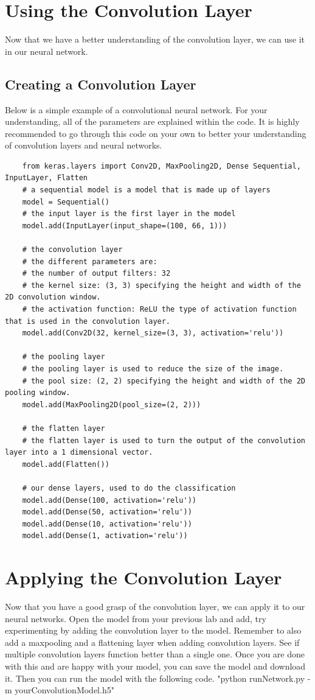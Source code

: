 \documentclass[11pt]{report}
\begin{document}
\clearpage

\chapter{Using the Convolution Layer}
Now that we have a better understanding of the convolution layer, we can use it in our neural network.
\section{Creating a Convolution Layer}
Below is a simple example of a convolutional neural network. For your understanding, all of the parameters are explained within the code. It is highly recommended to go through this code on your own to better your understanding of convolution layers and neural networks.
\begin{verbatim} 
    from keras.layers import Conv2D, MaxPooling2D, Dense Sequential, InputLayer, Flatten
    # a sequential model is a model that is made up of layers
    model = Sequential()
    # the input layer is the first layer in the model
    model.add(InputLayer(input_shape=(100, 66, 1)))

    # the convolution layer
    # the different parameters are:
    # the number of output filters: 32
    # the kernel size: (3, 3) specifying the height and width of the 2D convolution window.
    # the activation function: ReLU the type of activation function that is used in the convolution layer.
    model.add(Conv2D(32, kernel_size=(3, 3), activation='relu'))

    # the pooling layer
    # the pooling layer is used to reduce the size of the image.
    # the pool size: (2, 2) specifying the height and width of the 2D pooling window.
    model.add(MaxPooling2D(pool_size=(2, 2)))

    # the flatten layer
    # the flatten layer is used to turn the output of the convolution layer into a 1 dimensional vector.
    model.add(Flatten())

    # our dense layers, used to do the classification
    model.add(Dense(100, activation='relu'))
    model.add(Dense(50, activation='relu'))
    model.add(Dense(10, activation='relu'))
    model.add(Dense(1, activation='relu'))
\end{verbatim}

\chapter{Applying the Convolution Layer}
Now that you have a good grasp of the convolution layer, we can apply it to our neural networks. Open the model from your previous lab and add, try experimenting by adding the convolution layer to the model. Remember to also add a maxpooling and a flattening layer when adding convolution layers. See if multiple convolution layers function better than a single one. Once you are done with this and are happy with your model, you can save the model and download it. Then you can run the model with the following code.
"python runNetwork.py -m yourConvolutionModel.h5"  
\end{document}
